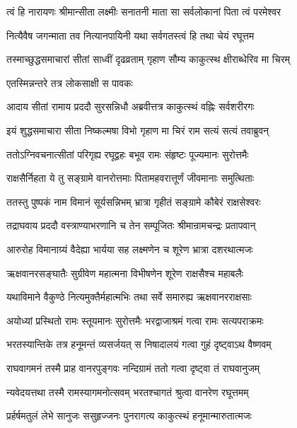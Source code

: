 \twolineshloka
{त्वं हि नारायणः श्रीमान्सीता लक्ष्मीः सनातनी}
{माता सा सर्वलोकानां पिता त्वं परमेश्वर}%

\twolineshloka
{नित्यैवैष जगन्माता तव नित्यानपायिनी}
{यथा सर्वगतस्त्वं हि तथा चेयं रघूत्तम}%

\twolineshloka
{तस्माच्छुद्धसमाचारां सीतां साध्वीं दृढव्रताम्}
{गृहाण सौम्य काकुत्स्थ क्षीराब्धेरिव मा चिरम्}%


एतस्मिन्नन्तरे तत्र लोकसाक्षी स पावकः

\twolineshloka
{आदाय सीतां रामाय प्रददौ सुरसन्निधौ}
{अब्रवीत्तत्र काकुत्स्थं वह्निः सर्वशरीरगः}%


\twolineshloka
{इयं शुद्धसमाचारा सीता निष्कल्मषा विभो}
{गृहाण मा चिरं राम सत्यं सत्यं तवाब्रुवन्}%


\twolineshloka
{ततोऽग्निवचनात्सीतां परिगृह्य रघूद्वहः}
{बभूव रामः संहृष्टः पूज्यमानः सुरोत्तमैः}%

\twolineshloka
{राक्षसैर्निहता ये तु सङ्ग्रामे वानरोत्तमाः}
{पितामहवरात्तूर्णं जीवमानाः समुत्थिताः}%

\twolineshloka
{ततस्तु पुष्पकं नाम विमानं सूर्यसन्निभम्}
{भ्रात्रा गृहीतं सङ्ग्रामे कौबेरं राक्षसेश्वरः}%

\twolineshloka
{तद्राघवाय प्रददौ वस्त्राण्याभरणानि च}
{तेन सम्पूजितः श्रीमान्रामचन्द्रः प्रतापवान्}%

\twolineshloka
{आरुरोह विमानाग्र्यं वैदेह्या भार्यया सह}
{लक्ष्मणेन च शूरेण भ्रात्रा दशरथात्मजः}%

\twolineshloka
{ऋक्षवानरसङ्घातैः सुग्रीवेण महात्मना}
{विभीषणेन शूरेण राक्षसैश्च महाबलैः}%

\twolineshloka
{यथाविमाने वैकुण्ठे नित्यमुक्तैर्महात्मभिः}
{तथा सर्वे समारुह्य ऋक्षवानरराक्षसाः}%

\twolineshloka
{अयोध्यां प्रस्थितो रामः स्तूयमानः सुरोत्तमैः}
{भरद्वाजाश्रमं गत्वा रामः सत्यपराक्रमः}%

\twolineshloka
{भरतस्यान्तिके तत्र हनूमन्तं व्यसर्जयत्}
{स निषादालयं गत्वा गुहं दृष्ट्वाऽथ वैष्णवम्}%

\twolineshloka
{राघवागमनं तस्मै प्राह वानरपुङ्गवः}
{नन्दिग्रामं ततो गत्वा दृष्ट्वा तं राघवानुजम्}%

\twolineshloka
{न्यवेदयत्तथा तस्मै रामस्यागमनोत्सवम्}
{भरतश्चागतं श्रुत्वा वानरेण रघूत्तमम्}%

\twolineshloka
{प्रर्हर्षमतुलं लेभे सानुजः ससुहृज्जनः}
{पुनरागत्य काकुत्स्थं हनूमान्मारुतात्मजः}%

